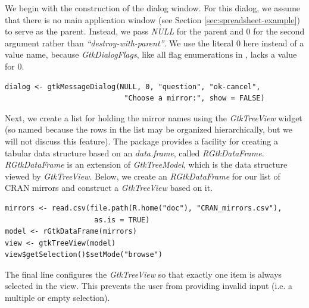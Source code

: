 \documentclass[article]{jss}
\begin{document}
We begin with the construction of the dialog window. For this dialog,
we 
assume that there is no main application window (see Section
\ref{sec:spreadsheet-example}) to serve as the
parent. 
Instead, we pass \emph{NULL} for the parent and $0$ 
for the second argument rather than \emph{``destroy-with-parent''}. We use the literal $0$ here instead of a value name, because \emph{GtkDialogFlags}, like all flag enumerations in , lacks a value for $0$.
\begin{verbatim}
dialog <- gtkMessageDialog(NULL, 0, "question", "ok-cancel", 
                            "Choose a mirror:", show = FALSE)
\end{verbatim}
Next, we create a list for holding the mirror names using the
\emph{GtkTreeView}
widget  (so named because the rows in the list may be organized hierarchically, but we will not discuss this feature). 
The  package provides a facility for creating a tabular data structure based on an  \emph{data.frame},
called \emph{RGtkDataFrame}. \emph{RGtkDataFrame} is an extension of
\emph{GtkTreeModel}, which is the data structure viewed by
\emph{GtkTreeView}. Below, we create an \emph{RGtkDataFrame} for our
list of CRAN mirrors and construct a \emph{GtkTreeView} based on it.
\begin{verbatim}
mirrors <- read.csv(file.path(R.home("doc"), "CRAN_mirrors.csv"),
                     as.is = TRUE)
model <- rGtkDataFrame(mirrors)
view <- gtkTreeView(model)
view$getSelection()$setMode("browse")
\end{verbatim}
The final line configures the \emph{GtkTreeView} so that exactly one item is always selected in the view. This prevents the user from providing invalid input (i.e. a multiple or empty selection). 
\end{document}
